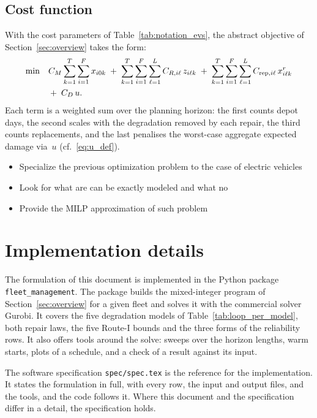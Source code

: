 \documentclass[11pt,a4paper]{article}
\theoremstyle{plain}
\theoremstyle{definition}
\theoremstyle{remark}
\begin{document}
\subsection{Cost function}

With the cost parameters of Table~\ref{tab:notation_evs}, the abstract objective of Section~\ref{sec:overview} takes the form:
\begin{align}\label{eq:objective_evs}
\min \quad
  & C_M \sum_{k=1}^{T} \sum_{i=1}^{F} x_{i0k}
  \;+\; \sum_{k=1}^{T} \sum_{i=1}^{F} \sum_{\ell=1}^{L} C_{R,i\ell}\, z_{i\ell k}
  \;+\; \sum_{k=1}^{T} \sum_{i=1}^{F} \sum_{\ell=1}^{L} C_{\mathrm{rep},i\ell}\, x^r_{i\ell k} \notag \\
  & +\; C_D\, u.
\end{align}
Each term is a weighted sum over the planning horizon:
the first counts depot days, the second scales with the degradation removed by each repair, the third counts replacements, and the last penalises the worst-case aggregate expected damage via~$u$ (cf.~\eqref{eq:u_def}).

\begin{itemize}
    \item Specialize the previous optimization problem to the case of electric vehicles
    \item Look for what are can be exactly modeled and what no
    \item Provide the MILP approximation of such problem
\end{itemize}

\section{Implementation details}

The formulation of this document is implemented in the Python package \texttt{fleet\_management}.
The package builds the mixed-integer program of Section~\ref{sec:overview} for a given fleet and solves it with the commercial solver Gurobi.
It covers the five degradation models of Table~\ref{tab:loop_per_model}, both repair laws, the five Route-I bounds and the three forms of the reliability rows.
It also offers tools around the solve: sweeps over the horizon lengths, warm starts, plots of a schedule, and a check of a result against its input.

The software specification \texttt{spec/spec.tex} is the reference for the implementation.
It states the formulation in full, with every row, the input and output files, and the tools, and the code follows it.
Where this document and the specification differ in a detail, the specification holds.
\end{document}
